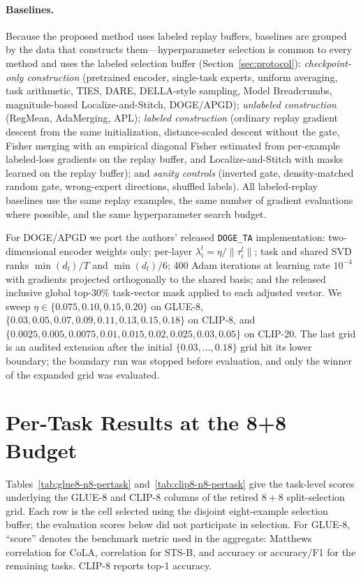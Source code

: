 \documentclass{article} %
\begin{document}
\paragraph{Baselines.}
Because the proposed method uses labeled replay buffers, baselines are grouped by the data that constructs them---hyperparameter selection is common to every method and uses the labeled selection buffer (Section~\ref{sec:protocol}): \emph{checkpoint-only construction} (pretrained encoder, single-task experts, uniform averaging, task arithmetic, TIES, DARE, DELLA-style sampling, Model Breadcrumbs, magnitude-based Localize-and-Stitch, DOGE/APGD); \emph{unlabeled construction} (RegMean, AdaMerging, APL); \emph{labeled construction} (ordinary replay gradient descent from the same initialization, distance-scaled descent without the gate, Fisher merging with an empirical diagonal Fisher estimated from per-example labeled-loss gradients on the replay buffer, and Localize-and-Stitch with masks learned on the replay buffer); and \emph{sanity controls} (inverted gate, density-matched random gate, wrong-expert directions, shuffled labels). All labeled-replay baselines use the same replay examples, the same number of gradient evaluations where possible, and the same hyperparameter search budget.

For DOGE/APGD we port the authors' released \texttt{DOGE\_TA} implementation: two-dimensional encoder weights only; per-layer $\lambda_i^l=\eta/\lVert\tau_i^l\rVert$; task and shared SVD ranks $\min(d_l)/T$ and $\min(d_l)/6$; 400 Adam iterations at learning rate $10^{-4}$ with gradients projected orthogonally to the shared basis; and the released inclusive global top-$30\%$ task-vector mask applied to each adjusted vector. We sweep $\eta\in\{0.075,0.10,0.15,0.20\}$ on GLUE-8, $\{0.03,0.05,0.07,0.09,0.11,0.13,0.15,0.18\}$ on CLIP-8, and $\{0.0025,0.005,0.0075,0.01,0.015,0.02,0.025,0.03,0.05\}$ on CLIP-20. The last grid is an audited extension after the initial $\{0.03,\ldots,0.18\}$ grid hit its lower boundary; the boundary run was stopped before evaluation, and only the winner of the expanded grid was evaluated.

\section{Per-Task Results at the 8+8 Budget}
\label{app:n8-pertask}

Tables~\ref{tab:glue8-n8-pertask} and~\ref{tab:clip8-n8-pertask}
give the task-level scores underlying the GLUE-8 and CLIP-8
columns of the retired $8{+}8$ split-selection grid. Each row is the cell selected using the
disjoint eight-example selection buffer; the evaluation scores below did not
participate in selection. For GLUE-8, ``score'' denotes the benchmark metric
used in the aggregate: Matthews correlation for CoLA, correlation for STS-B,
and accuracy or accuracy/F1 for the remaining tasks. CLIP-8 reports top-1
accuracy.
\end{document}
